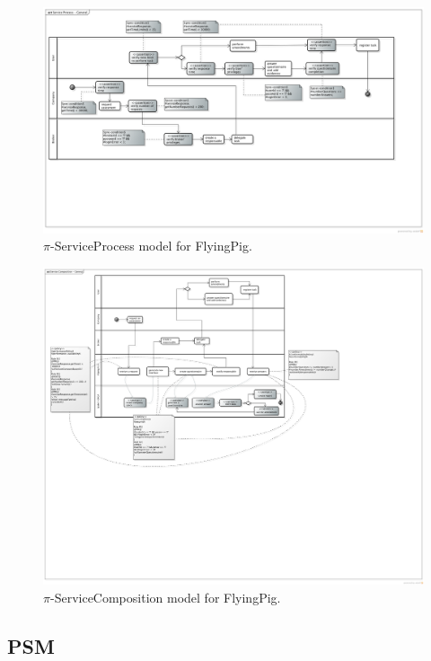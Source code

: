 \begin{figure}
\centering
\includegraphics[width=1.0\textwidth]{figs/ServiceProcessGeneral.png}
\caption{$\pi$-ServiceProcess model for FlyingPig.\label{fig:PiServiceProcessModel}}
\label{fig:bpmn}
\end{figure}

\begin{figure}
\centering
\includegraphics[width=1.0\textwidth]{figs/ServiceCompositionGeneral.png}
\caption{$\pi$-ServiceComposition model for FlyingPig.\label{fig:PiServiceCompositionModel}}
\label{fig:bpmn}
\end{figure}


\subsection{PSM}

